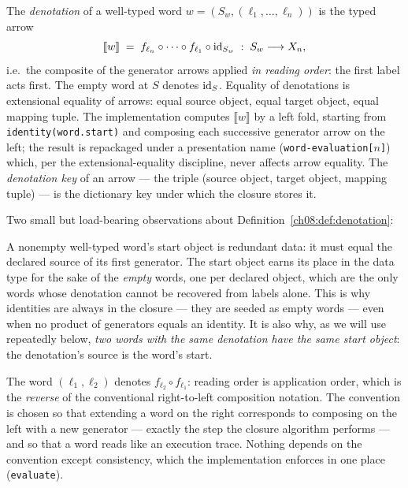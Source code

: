 \begin{definition}[Denotation]\label{ch08:def:denotation}
The \emph{denotation} of a well-typed word $w=(S_w,(\ell_1,\dots,\ell_n))$
is the typed arrow
\[
[\![ w]\!] \;=\; f_{\ell_n}\circ\cdots\circ f_{\ell_1}\circ
\mathrm{id}_{S_w}\;:\;S_w\longrightarrow X_n ,
\]
i.e.\ the composite of the generator arrows applied \emph{in reading
order}: the first label acts first. The empty word at $S$ denotes
$\mathrm{id}_S$. Equality of denotations is extensional equality of arrows: equal
source object, equal target object, equal mapping tuple. The implementation
computes $\llbracket w\rrbracket$ by a left fold, starting from
\texttt{identity(word.start)} and composing each successive generator arrow
on the left; the result is repackaged under a presentation name
(\texttt{word-evaluation[$n$]}) which, per the extensional-equality
discipline, never affects arrow equality. The \emph{denotation key} of an
arrow --- the triple (source object, target object, mapping tuple) --- is
the dictionary key under which the closure stores it.
\end{definition}

Two small but load-bearing observations about
Definition~\ref{ch08:def:denotation}:

\begin{remark}\label{ch08:rem:typepath}
A nonempty well-typed word's start object is redundant data: it must equal
the declared source of its first generator. The start object earns its place
in the data type for the sake of the \emph{empty} words, one per declared
object, which are the only words whose denotation cannot be recovered from
labels alone. This is why identities are always in the closure --- they are
seeded as empty words --- even when no product of generators equals an
identity. It is also why, as we will use repeatedly below, \emph{two words
with the same denotation have the same start object}: the denotation's
source is the word's start.
\end{remark}

\begin{remark}\label{ch08:rem:order}
The word $(\ell_1,\ell_2)$ denotes $f_{\ell_2}\circ f_{\ell_1}$: reading
order is application order, which is the \emph{reverse} of the conventional
right-to-left composition notation. The convention is chosen so that
extending a word on the right corresponds to composing on the left with a
new generator --- exactly the step the closure algorithm performs --- and so
that a word reads like an execution trace. Nothing depends on the
convention except consistency, which the implementation enforces in one
place (\texttt{evaluate}).
\end{remark}

